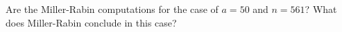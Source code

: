   Are the Miller-Rabin computations for the case of $a = 50$ and $n = 561$?
  What does Miller-Rabin conclude in this case?

